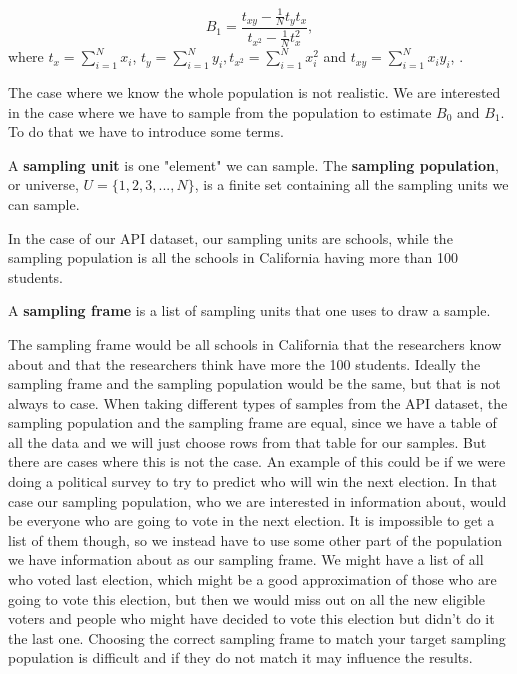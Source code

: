 \documentclass{article}
\begin{document}
\begin{equation} \label{eq:B1}
 B_1 = \frac{t_{xy} - \frac{1}{N} t_y t_x}
   {t_{x^2} - \frac{1}{N} t_x^2},
\end{equation}
where \(t_x = \sum_{i = 1}^N x_i\), \(t_y = \sum_{i = 1}^N y_i, t_{x^2} =
\sum_{i = 1}^N x_i^2\) and \(t_{xy} =
\sum_{i = 1}^N x_i y_i\), \cite[Chapter 11]{sampReg}.

The case where we know the whole population is not realistic. We are interested in the case where we have to sample from the
population to estimate \(B_0\) and \(B_1\). To do that we have to introduce some terms.


\begin{definition} \label{def:sampUnitPop}
 A \textbf{sampling unit} is one "element" we can sample.
 The \textbf{sampling population}, or universe, \(U = \{1, 2, 3, ..., N\}\), is a
 finite set containing all the sampling units we can sample.
\end{definition}

In the case of our API dataset, our sampling units are schools, while
the sampling population is all the schools in California having more than 100 students.

\begin{definition} \label{def:sampFrame}
 A \textbf{sampling frame} is a list of sampling units that one uses to draw a sample.
\end{definition}

The sampling frame would be all schools in California that the researchers know
about and that the researchers think have more the 100 students.
Ideally the sampling frame and the sampling population would be the same, but that is not always to case.
When taking different types of samples from the API dataset, the sampling population and the sampling frame are equal, since
we have a table of all the data and we will just choose rows from that table for
our samples. But there are cases where this is not the case. An example of this
could be if we were doing a political survey to try to predict who will win the
next election.
In that case our sampling population, who we are interested in information
about, would be everyone who are going to vote in the next election. It is
impossible to get a list of them though, so we instead have to use 
some other part of the population we have information about as our sampling frame. We might have a
list of all who voted last election, which might be a good approximation of
those who are going to vote this election, but then we would miss out on all the
new eligible voters and people who might have decided to vote this election but
didn't do it the last one.
Choosing the correct sampling frame to match your target sampling population is
difficult and if they do not match it may influence the results.
\end{document}

